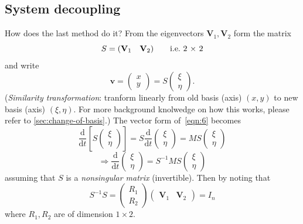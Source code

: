 \documentclass[12pt]{report}
\theoremstyle{definition}
\begin{document}
\subsection{System decoupling}%
\label{sec:system_decoupling}
How does the last method do it? From the eigenvectors $\mathbf{V}_1, \mathbf{V}_2$ form the matrix\[
    S = (\mathbf{V}_1 \quad \mathbf{V}_2) \qquad\textnormal{i.e.\ 2 $\times$ 2}
\]and write \[\mathbf{v} = \begin{pmatrix}
        x \\
        y
    \end{pmatrix} = S\begin{pmatrix}
            \xi \\
            \eta
    \end{pmatrix}.
\]
(\emph{Similarity transformation}: tranform linearly from old basis (axis) $(x,y)$ 
to new basis (axis) $(\xi, \eta)$. For more background knolwedge on how this
works, please refer to \autoref{sec:change-of-basis}.)
The vector form of~\eqref{eqn:6} becomes\[
    \frac{\mathrm{d}}{\mathrm{d}t} \left[S \begin{pmatrix}
            \xi \\
            \eta
    \end{pmatrix} \right] 
    = S\frac{\mathrm{d}}{\mathrm{d}t} \begin{pmatrix}
            \xi \\
            \eta
    \end{pmatrix} 
    = MS\begin{pmatrix}
            \xi \\
            \eta
    \end{pmatrix} 
\]\[
    \Rightarrow{}\frac{\mathrm{d}}{\mathrm{d}t} \begin{pmatrix}
            \xi \\
            \eta
    \end{pmatrix} = S^{-1}MS\begin{pmatrix}
            \xi \\
            \eta
    \end{pmatrix} 
\]assuming that $S$ is a \emph{nonsingular matrix} (invertible).  
Then by noting that\[
    S^{-1}S = \begin{pmatrix}
            R_1 \\
            R_2
    \end{pmatrix} \begin{pmatrix}
    \mathbf{V}_1 & \mathbf{V}_2
    \end{pmatrix} = I_n
\]where $R_1, R_2$ are of dimension $1 \times 2$.
\end{document}
